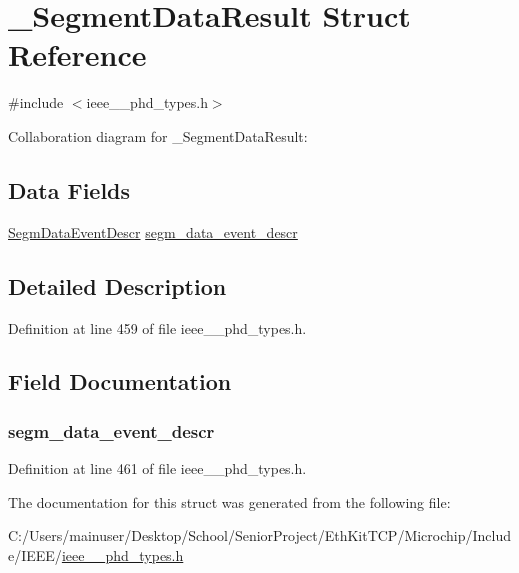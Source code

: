 \hypertarget{struct___segment_data_result}{}\section{\+\_\+\+Segment\+Data\+Result Struct Reference}
\label{struct___segment_data_result}


{\ttfamily \#include $<$ieee\+\_\+\_\+phd\+\_\+types.\+h$>$}



Collaboration diagram for \+\_\+\+Segment\+Data\+Result\+:
\subsection*{Data Fields}
\begin{DoxyCompactItemize}
\item 
\hyperlink{ieee__11073__phd__types_8h_a27fbf18ec4622cdc3077368771b1ba92}{Segm\+Data\+Event\+Descr} \hyperlink{struct___segment_data_result_a68f1efd53586d9809bc2d61844b88568}{segm\+\_\+data\+\_\+event\+\_\+descr}
\end{DoxyCompactItemize}


\subsection{Detailed Description}


Definition at line 459 of file ieee\+\_\+\_\+phd\+\_\+types.\+h.



\subsection{Field Documentation}
\hypertarget{struct___segment_data_result_a68f1efd53586d9809bc2d61844b88568}{}
\subsubsection[{segm\+\_\+data\+\_\+event\+\_\+descr}]{ segm\+\_\+data\+\_\+event\+\_\+descr}\label{struct___segment_data_result_a68f1efd53586d9809bc2d61844b88568}


Definition at line 461 of file ieee\+\_\+\_\+phd\+\_\+types.\+h.



The documentation for this struct was generated from the following file\+:\begin{DoxyCompactItemize}
\item 
C\+:/\+Users/mainuser/\+Desktop/\+School/\+Senior\+Project/\+Eth\+Kit\+T\+C\+P/\+Microchip/\+Include/\+I\+E\+E\+E/\hyperlink{ieee__11073__phd__types_8h}{ieee\+\_\+\_\+phd\+\_\+types.\+h}\end{DoxyCompactItemize}
